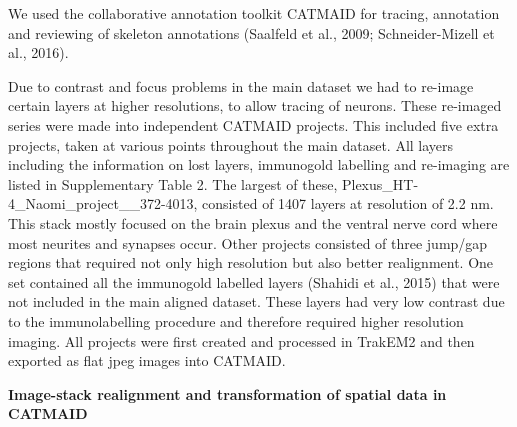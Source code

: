 \documentclass[
  11pt,
]{article}
\begin{document}
We used the collaborative annotation toolkit CATMAID for tracing,
annotation and reviewing of skeleton annotations (Saalfeld et al., 2009;
Schneider-Mizell et al., 2016).

Due to contrast and focus problems in the main dataset we had to
re-image certain layers at higher resolutions, to allow tracing of
neurons. These re-imaged series were made into independent CATMAID
projects. This included five extra projects, taken at various points
throughout the main dataset. All layers including the information on
lost layers, immunogold labelling and re-imaging are listed in
Supplementary Table 2. The largest of these,
Plexus\_HT-4\_Naomi\_project\_\_372-4013, consisted of 1407 layers at
resolution of 2.2 nm. This stack mostly focused on the brain plexus and
the ventral nerve cord where most neurites and synapses occur. Other
projects consisted of three jump/gap regions that required not only high
resolution but also better realignment. One set contained all the
immunogold labelled layers (Shahidi et al., 2015) that were not included
in the main aligned dataset. These layers had very low contrast due to
the immunolabelling procedure and therefore required higher resolution
imaging. All projects were first created and processed in TrakEM2 and
then exported as flat jpeg images into CATMAID.

\textbf{Image-stack realignment and transformation of spatial data in
CATMAID}
\end{document}
